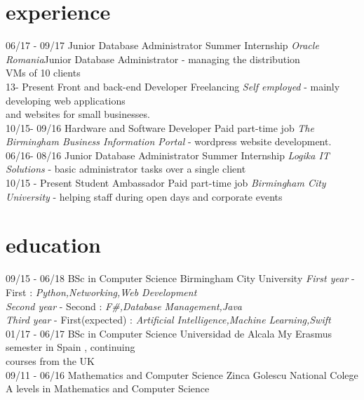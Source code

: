 \documentclass[]{friggeri-cv}
\begin{document}
\section{experience}
\begin{entrylist}
    \entry
  {06/17 - 09/17}
  {Junior Database Administrator}
  {Summer Internship}
  {\emph{Oracle Romania}{Junior Database Administrator} - managing the distribution \\VMs of 10 clients}\\

  \entry
  {13- Present}
  {Front and back-end Developer}
  {Freelancing}
  {\emph {Self employed} - mainly developing web applications \\and websites for small businesses.}
 \\
  \entry
  {10/15- 09/16}
  {Hardware and Software Developer}
  {Paid part-time job}
  {\emph{The Birmingham Business Information Portal} - wordpress website development.}
  \\
  \entry
  {06/16- 08/16}
  {Junior Database Administrator}
  {Summer Internship}
  {\emph{Logika IT Solutions} - basic administrator tasks over a single client}
  \\
  \entry
  {10/15 - Present}
  {Student Ambassador}
  {Paid part-time job}
  {\emph{Birmingham City University} - helping staff during open days and corporate events }

\end{entrylist}


\section{education}
\begin{entrylist}
  \entry
  {09/15 - 06/18}
  {BSc in Computer Science}
  {Birmingham City University}
  {
        \emph{First year }- First : \emph{Python,Networking,Web Development} \\
        \emph{Second year } - Second : \emph{F\#,Database Management,Java} \\
        \emph{Third year }- First(expected) : \emph{Artificial Intelligence,Machine Learning,Swift}
  }
  \\
  \entry
  {01/17 - 06/17}
  {BSc in Computer Science }
  {Universidad de Alcala}
  {My Erasmus semester in Spain , continuing \\courses from the UK
  }
  \\
  \entry
  {09/11 - 06/16}
  {Mathematics and Computer Science}
  {Zinca Golescu National Colege}
  {A levels in Mathematics and Computer Science}

  \end{entrylist}
\end{document}
